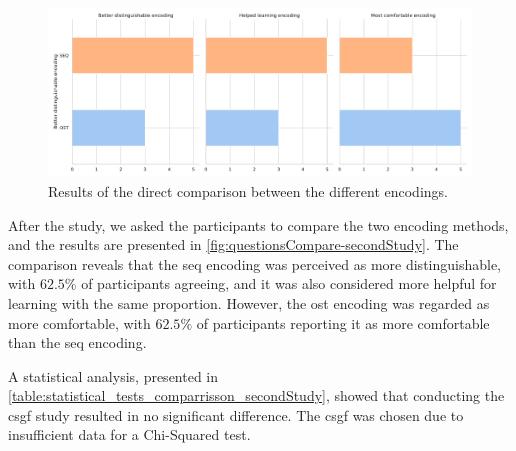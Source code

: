 
\begin{figure}
    \centering
    \includegraphics[width=\linewidth]{src/pictures/Study2Data_questionnaire/questions_compare_study2.pdf}
    \caption{Results of the direct comparison between the different encodings.}
    \label{fig:questionsCompare-secondStudy}
\end{figure}

After the study, we asked the participants to compare the two encoding methods, and the results are presented in \autoref{fig:questionsCompare-secondStudy}.
The comparison reveals that the \gls{seq} encoding was perceived as more distinguishable, with $62.5\%$ of participants agreeing, and it was also considered more helpful for learning with the same proportion.
However, the \gls{ost} encoding was regarded as more comfortable, with $62.5\%$ of participants reporting it as more comfortable than the \gls{seq} encoding.


A statistical analysis, presented in \autoref{table:statistical_tests_comparrisson_secondStudy}, showed that conducting the \gls{csgf} study resulted in no significant difference.
The \gls{csgf} was chosen due to insufficient data for a Chi-Squared test.

\begin{table}
    \caption{Statistical \gls{csgf} Results for the direct comparison between the stimuli.}
    \label{table:statistical_tests_comparrisson_secondStudy}
\end{table}





